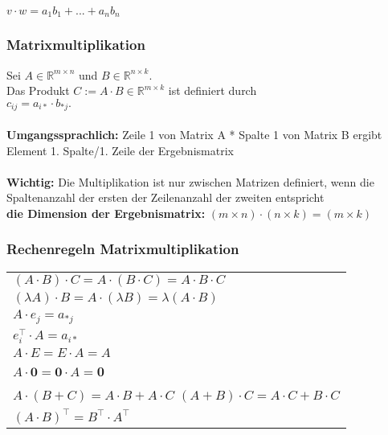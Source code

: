 \documentclass[6pt,a4paper]{scrartcl}
\newcommand{\R}{\mathbb{R}}
\begin{document}
\begin{multicols*}{3}
$v \cdot w = a_1 b_1 + ... +a_n b_n$
\\
\subsubsection{Matrixmultiplikation}
Sei   $A \in \R^{m\times n}$   und   $B \in \R^{n\times k}.$\\
Das Produkt $C := A\cdot B \in \R^{m\times k}$ ist definiert durch\\
$c_{ij} = a_{i*} \cdot b_{*j}.$\\
\\
\textbf{Umgangssprachlich:} Zeile 1 von Matrix A * Spalte 1 von Matrix B ergibt Element 1. Spalte/1. Zeile der Ergebnismatrix\\
\\
\textbf{Wichtig:} Die Multiplikation ist nur zwischen Matrizen definiert, wenn die Spaltenanzahl der ersten der Zeilenanzahl der zweiten entspricht\\
\textbf{die Dimension der Ergebnismatrix:} $(m\times n)\cdot (n \times k) = (m \times k)$ \\
\subsubsection{Rechenregeln Matrixmultiplikation}
\begin{tabular}{l}
$(A \cdot B) \cdot C = A \cdot (B \cdot C)  = A \cdot B \cdot C$ \\
$(\lambda A) \cdot B = A \cdot (\lambda B)  = \lambda (A \cdot B)$ \\
$A \cdot e_j = a_{*j}$ \\
$e_i^\top \cdot A = a_{i*}$ \\
$A \cdot E = E \cdot A  = A$ \\
$A \cdot \textbf{0} = \textbf{0} \cdot A  = $\textbf{0} \\
$A \cdot(B + C) = A \cdot B + A \cdot C $ 
$(A+B) \cdot C = A \cdot C + B \cdot C $ \\
$(A \cdot B)^\top = B^\top \cdot A^\top $ \\
\end{tabular}


\end{multicols*}
\end{document}

